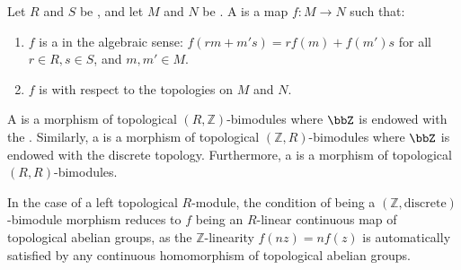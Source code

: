 \begin{definition} \label{definition:morphism_of_topological_modules_over_topological_rings}
Let $R$ and $S$ be , and let $M$ and $N$ be . A  is a map $f: M \to N$ such that:
\begin{enumerate}
    \item $f$ is a  in the algebraic sense: $f(rm + m's) = r f(m) + f(m')s$ for all $r \in R, s \in S$, and $m, m' \in M$.
    \item $f$ is  with respect to the topologies on $M$ and $N$.

\end{enumerate}


    A  is a morphism of topological $(R, \mathbb{Z})$-bimodules where $\bbZ$ is endowed with the . Similarly, a  is a morphism of topological $(\mathbb{Z}, R)$-bimodules where $\bbZ$ is endowed with the discrete topology. Furthermore, a  is a morphism of topological $(R, R)$-bimodules.

    In the case of a left topological $R$-module, the condition of being a $(\mathbb{Z}, \text{discrete})$-bimodule morphism reduces to $f$ being an $R$-linear continuous map of topological abelian groups, as the $\mathbb{Z}$-linearity $f(nz) = nf(z)$ is automatically satisfied by any continuous homomorphism of topological abelian groups.
\end{definition}